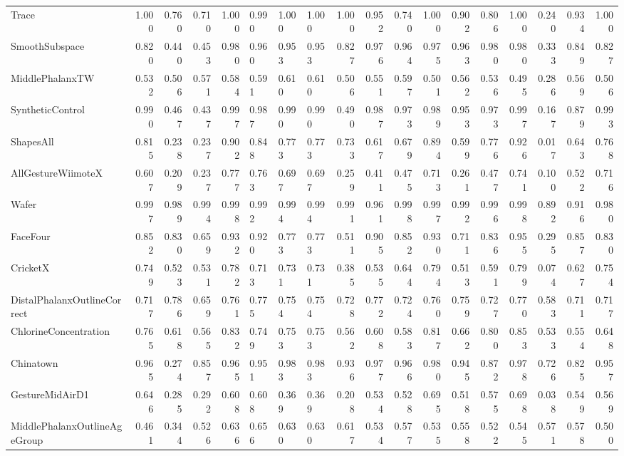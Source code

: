 \begin{tabular}{lrrrrlllrrrrrrrrrr}
Trace & 1.000 & 0.760 & 0.710 & 1.000 & 0.990 & 1.000 & 1.000 & 1.000 & 0.952 & 0.740 & 1.000 & 0.902 & 0.806 & 1.000 & 0.240 & 0.934 & 1.000 \\
SmoothSubspace & 0.820 & 0.440 & 0.453 & 0.980 & 0.960 & 0.953 & 0.953 & 0.827 & 0.976 & 0.964 & 0.975 & 0.963 & 0.980 & 0.980 & 0.333 & 0.849 & 0.827 \\
MiddlePhalanxTW & 0.532 & 0.506 & 0.571 & 0.584 & 0.591 & 0.610 & 0.610 & 0.506 & 0.551 & 0.597 & 0.501 & 0.562 & 0.536 & 0.495 & 0.286 & 0.569 & 0.506 \\
SyntheticControl & 0.990 & 0.467 & 0.437 & 0.997 & 0.987 & 0.990 & 0.990 & 0.490 & 0.987 & 0.973 & 0.989 & 0.953 & 0.973 & 0.997 & 0.167 & 0.879 & 0.993 \\
ShapesAll & 0.815 & 0.238 & 0.237 & 0.902 & 0.848 & 0.773 & 0.773 & 0.733 & 0.617 & 0.679 & 0.894 & 0.599 & 0.776 & 0.926 & 0.017 & 0.643 & 0.768 \\
AllGestureWiimoteX & 0.607 & 0.209 & 0.237 & 0.777 & 0.763 & 0.697 & 0.697 & 0.259 & 0.411 & 0.475 & 0.713 & 0.261 & 0.477 & 0.741 & 0.100 & 0.522 & 0.716 \\
Wafer & 0.997 & 0.989 & 0.994 & 0.998 & 0.992 & 0.994 & 0.994 & 0.991 & 0.961 & 0.998 & 0.997 & 0.992 & 0.996 & 0.998 & 0.892 & 0.916 & 0.980 \\
FaceFour & 0.852 & 0.830 & 0.659 & 0.932 & 0.920 & 0.773 & 0.773 & 0.511 & 0.905 & 0.852 & 0.930 & 0.711 & 0.836 & 0.955 & 0.295 & 0.857 & 0.830 \\
CricketX & 0.749 & 0.523 & 0.531 & 0.782 & 0.713 & 0.731 & 0.731 & 0.385 & 0.535 & 0.644 & 0.794 & 0.513 & 0.591 & 0.799 & 0.074 & 0.627 & 0.754 \\
DistalPhalanxOutlineCorrect & 0.717 & 0.786 & 0.659 & 0.761 & 0.775 & 0.754 & 0.754 & 0.728 & 0.772 & 0.724 & 0.760 & 0.759 & 0.727 & 0.770 & 0.583 & 0.711 & 0.717 \\
ChlorineConcentration & 0.765 & 0.618 & 0.565 & 0.832 & 0.749 & 0.753 & 0.753 & 0.562 & 0.608 & 0.583 & 0.817 & 0.662 & 0.800 & 0.853 & 0.533 & 0.554 & 0.648 \\
Chinatown & 0.965 & 0.274 & 0.857 & 0.965 & 0.951 & 0.983 & 0.983 & 0.936 & 0.977 & 0.966 & 0.980 & 0.945 & 0.872 & 0.978 & 0.726 & 0.825 & 0.957 \\
GestureMidAirD1 & 0.646 & 0.285 & 0.292 & 0.608 & 0.608 & 0.369 & 0.369 & 0.208 & 0.534 & 0.528 & 0.695 & 0.518 & 0.575 & 0.698 & 0.038 & 0.549 & 0.569 \\
MiddlePhalanxOutlineAgeGroup & 0.461 & 0.344 & 0.526 & 0.636 & 0.656 & 0.630 & 0.630 & 0.617 & 0.534 & 0.577 & 0.535 & 0.558 & 0.522 & 0.545 & 0.571 & 0.578 & 0.500 \\

\end{tabular}
